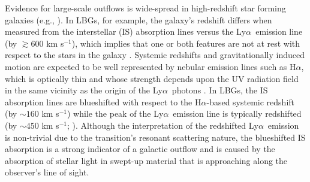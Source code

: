 \documentclass{emulateapj}
\newcommand{\lya}{Ly$\alpha$}
\newcommand{\ha}{H$\alpha$}
\begin{document}
Evidence for large-scale outflows is wide-spread in high-redshift star forming galaxies (e.g., \citealp{shapley2003,martin2005,berry2012}). In LBGs, for example, the galaxy's redshift differs when measured from the interstellar (IS) absorption lines versus the \lya\ emission line (by $\gtrsim600$ km s$^{-1}$), which implies that one or both features are not at rest with respect to the stars in the galaxy \citep{shapley2003}. Systemic redshifts and gravitationally induced motion are expected to be well represented by nebular emission lines such as \ha, which is optically thin and whose strength depends upon the UV radiation field in the same vicinity as the origin of the \lya\ photons \citep{erb2006}. In LBGs, the IS absorption lines are blueshifted with respect to the \ha-based systemic redshift (by $\sim160$ km s$^{-1}$) while the peak of the \lya\ emission line is typically redshifted (by $\sim450$ km s$^{-1}$; \citealp{steidel2010}). Although the interpretation of the redshifted \lya\ emission is non-trivial due to the transition's resonant scattering nature, the blueshifted IS absorption is a strong indicator of a galactic outflow and is caused by the absorption of stellar light in swept-up material that is approaching along the observer's line of sight.
\end{document}

